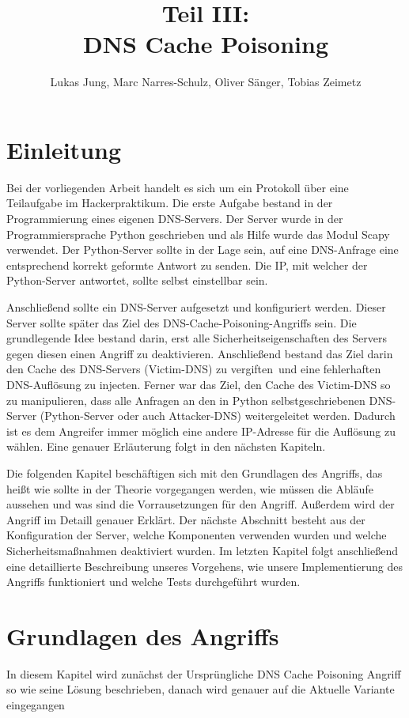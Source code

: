 \documentclass[10pt,a4paper]{article}
\author{Lukas Jung, Marc Narres-Schulz, Oliver Sänger, Tobias Zeimetz}
\title{Teil III: \\DNS Cache Poisoning}
\begin{document}
\maketitle
\newpage

\section{Einleitung}
Bei der vorliegenden Arbeit handelt es sich um ein Protokoll über eine Teilaufgabe im \glqq Hackerpraktikum\grqq. Die erste Aufgabe bestand in der Programmierung eines eigenen DNS-Servers. Der Server wurde in der Programmiersprache Python geschrieben und als Hilfe wurde das Modul Scapy verwendet. Der Python-Server sollte in der Lage sein, auf eine DNS-Anfrage eine entsprechend korrekt geformte Antwort zu senden. Die IP, mit welcher der Python-Server antwortet, sollte selbst einstellbar sein.

Anschließend sollte ein DNS-Server aufgesetzt und konfiguriert werden. Dieser Server sollte später das Ziel des DNS-Cache-Poisoning-Angriffs sein. Die grundlegende Idee bestand darin, erst alle Sicherheitseigenschaften des Servers gegen diesen einen Angriff zu deaktivieren. Anschließend bestand das Ziel darin den Cache des DNS-Servers (Victim-DNS) zu \glqq vergiften\grqq \ und eine fehlerhaften DNS-Auflösung zu injecten. Ferner war das Ziel, den Cache des Victim-DNS so zu manipulieren, dass alle Anfragen an den in Python selbstgeschriebenen DNS-Server (Python-Server oder auch Attacker-DNS) weitergeleitet werden. Dadurch ist es dem Angreifer immer möglich eine andere IP-Adresse für die Auflösung zu wählen. Eine genauer Erläuterung folgt in den nächsten Kapiteln.

Die folgenden Kapitel beschäftigen sich mit den Grundlagen des Angriffs, das heißt wie sollte in der Theorie vorgegangen werden, wie müssen die Abläufe aussehen und was sind die Vorrausetzungen für den Angriff. Außerdem wird der Angriff im Detaill genauer Erklärt. Der nächste Abschnitt besteht aus der Konfiguration der Server, welche Komponenten verwenden wurden und welche Sicherheitsmaßnahmen deaktiviert wurden. Im letzten Kapitel folgt anschließend eine detaillierte Beschreibung unseres Vorgehens, wie unsere Implementierung des Angriffs funktioniert und welche Tests durchgeführt wurden.
\section{Grundlagen des Angriffs}
In diesem Kapitel wird zunächst der Ursprüngliche DNS Cache Poisoning Angriff so wie seine Lösung beschrieben, danach wird genauer auf die Aktuelle Variante eingegangen
\end{document}
